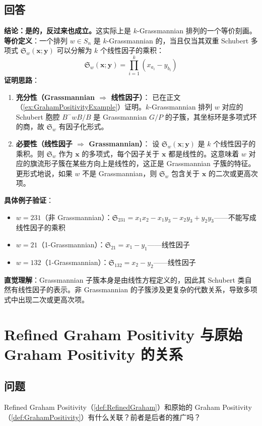 \subsection{回答}
\textbf{结论：是的，反过来也成立。}这实际上是 $k$-Grassmannian 排列的一个等价刻画。\textbf{等价定义}：一个排列 $w \in S_n$ 是 $k$-Grassmannian 的，当且仅当其双重 Schubert 多项式 $\mathfrak{S}_w(\mathbf{x}; \mathbf{y})$ 可以分解为 $k$ 个线性因子的乘积：$$\mathfrak{S}_w(\mathbf{x}; \mathbf{y}) = \prod_{i=1}^{k}(x_{a_i} - y_{b_i})$$\textbf{证明思路}：
\begin{enumerate}
\item \textbf{充分性（Grassmannian $\Rightarrow$ 线性因子）}：   已在正文（\cref{ex:GrahamPositivityExample}）证明。$k$-Grassmannian 排列 $w$ 对应的 Schubert 胞腔 $B^-wB/B$ 是 Grassmannian $G/P$ 的子簇，其坐标环是多项式环的商，故 $\mathfrak{S}_w$ 有因子化形式。\item \textbf{必要性（线性因子 $\Rightarrow$ Grassmannian）}：   设 $\mathfrak{S}_w(\mathbf{x}; \mathbf{y})$ 是 $k$ 个线性因子的乘积。则 $\mathfrak{S}_w$ 作为 $\mathbf{x}$ 的多项式，每个因子关于 $\mathbf{x}$ 都是线性的。这意味着 $w$ 对应的旗流形子簇在某些方向上是线性的，这正是 Grassmannian 子簇的特征。更形式地说，如果 $w$ 不是 Grassmannian，则 $\mathfrak{S}_w$ 包含关于 $\mathbf{x}$ 的二次或更高次项。
\end{enumerate}

\textbf{具体例子验证}：
\begin{itemize}
\item $w = 231$（非 Grassmannian）：$\mathfrak{S}_{231} = x_1x_2 - x_1y_3 - x_2y_3 + y_2y_3$——不能写成线性因子的乘积\item $w = 21$（1-Grassmannian）：$\mathfrak{S}_{21} = x_1 - y_1$——线性因子\item $w = 132$（1-Grassmannian）：$\mathfrak{S}_{132} = x_2 - y_2$——线性因子
\end{itemize}

\textbf{直觉理解}：Grassmannian 子簇本身是由线性方程定义的，因此其 Schubert 类自然有线性因子的表示。非 Grassmannian 的子簇涉及更复杂的代数关系，导致多项式中出现二次或更高次项。
\section{Refined Graham Positivity 与原始 Graham Positivity 的关系}\label{sec:RefinedVsOriginalGraham}
\subsection{问题}
Refined Graham Positivity（\cref{def:RefinedGraham}）和原始的 Graham Positivity（\cref{def:GrahamPositivity}）有什么关联？前者是后者的推广吗？

